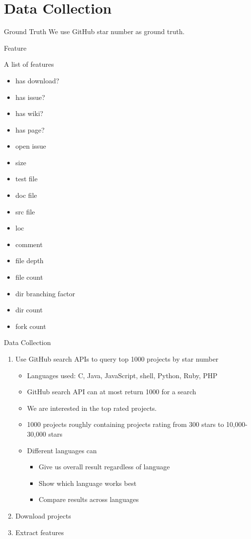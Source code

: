 \documentclass[presentation]{beamer}
\begin{document}
\section{Data Collection}
\begin{frame}{Ground Truth}
  We use GitHub star number as ground truth.
\end{frame}

\begin{frame}{Feature}
  \begin{multicols}{2}
    A list of features
    \begin{itemize}
    \item has download?
    \item has issue?
    \item has wiki?
    \item has page?
    \item open issue
    \item size
    \item test file
    \item doc file
    \item src file
    \item loc
    \item comment
    \item file depth
    \item file count
    \item dir branching factor
    \item dir count
    \item fork count
    \end{itemize}
  \end{multicols}
\end{frame}


\begin{frame}{Data Collection}
\begin{enumerate}
\item Use GitHub search APIs to query top 1000 projects by star number
  \begin{itemize}
  \item Languages used: C, Java, JavaScript, shell,
    Python, Ruby, PHP
  \item GitHub search API can at most return 1000 for a search
  \item We are interested in the top rated projects.
  \item 1000 projects roughly containing projects rating from 300
    stars to 10,000-30,000 stars
  \item Different languages can
    \begin{itemize}
    \item Give us overall result regardless of language
    \item Show which language works best
    \item Compare results across languages
    \end{itemize}
  \end{itemize}
\item Download projects
\item Extract features
\end{enumerate}
\end{frame}
\end{document}
